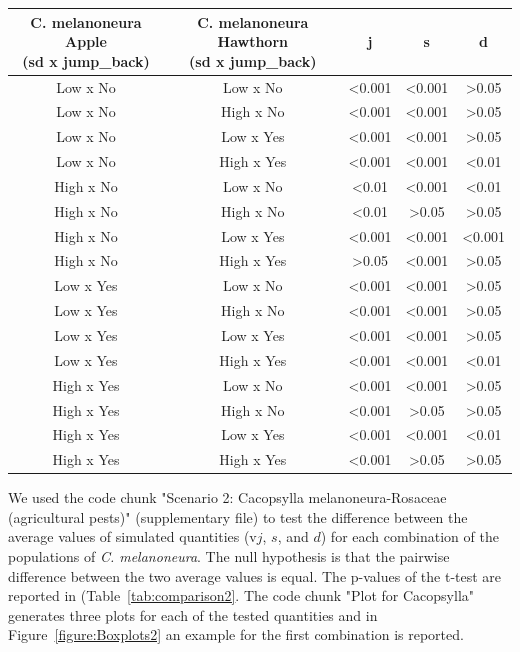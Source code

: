 \begin{table}[htbp]
\begin{tabular}{|c|c|c|c|c|}
 \hline
  \makecell{\textbf{C. melanoneura Apple} \\ (sd x jump\_back)} & \makecell{\textbf{C. melanoneura Hawthorn} \\ (sd x jump\_back)} & \textbf{j} & \textbf{s} & \textbf{d} \\
 \hline\hline
 \color{red}Low x No & Low x No &<0.001&<0.001&\color{gray}>0.05\\
 \color{red}Low x No & High x No &<0.001&<0.001&\color{gray}>0.05\\
 \color{red}Low x No & Low x Yes &<0.001&<0.001&\color{gray}>0.05\\
 \color{red}Low x No & High x Yes &<0.001&<0.001&<0.01\\
   \hline
 High x No & \color{red}Low x No &<0.01&<0.001&<0.01\\
 \color{red}High x No & High x No &<0.01&\color{gray}>0.05&\color{gray}>0.05\\
 High x No & \color{red}Low x Yes &<0.001&<0.001&<0.001\\
 High x No & \color{red}High x Yes &\color{gray}>0.05&<0.001&\color{gray}>0.05\\
   \hline
 \color{red}Low x Yes & Low x No &<0.001&<0.001&\color{gray}>0.05\\
 \color{red}Low x Yes & High x No &<0.001&<0.001&\color{gray}>0.05\\
 \color{red}Low x Yes & Low x Yes &<0.001&<0.001&\color{gray}>0.05\\
 \color{red}Low x Yes & High x Yes &<0.001&<0.001&<0.01\\
   \hline
 High x Yes & \color{red}Low x No &<0.001&<0.001&\color{gray}>0.05\\
 \color{red}High x Yes & High x No &<0.001&\color{gray}>0.05&\color{gray}>0.05\\
 High x Yes & \color{red}Low x Yes &<0.001&<0.001&<0.01\\
 \color{red}High x Yes & High x Yes &<0.001&\color{gray}>0.05&\color{gray}>0.05\\
  \hline
 \end{tabular}
 \end{table}
We used the code chunk "Scenario 2: Cacopsylla melanoneura-Rosaceae (agricultural pests)"  (supplementary file) to test the difference between the average values of simulated quantities (v$j$, $s$, and $d$) for each combination of the populations of \textit{C. melanoneura}. The null hypothesis is that the pairwise difference between the two average values is equal. The p-values of the t-test are reported in (Table~\ref{tab:comparison2}.
The code chunk "Plot for Cacopsylla" generates three plots for each of the tested quantities and in Figure~\ref{figure:Boxplots2} an example for the first combination is reported.

